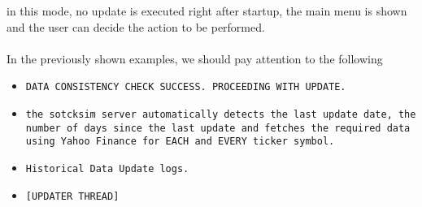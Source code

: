 in this mode, no update is executed right after startup, the main menu is shown
and the user can decide the action to be performed.\\
\\
In the previously shown examples, we should pay attention to the following
\begin{itemize}
    \item \texttt{DATA CONSISTENCY CHECK SUCCESS. PROCEEDING WITH UPDATE.}
    \item \texttt{the sotcksim server automatically detects the last update
    date, the number of days since the last update and fetches the required
    data using Yahoo Finance for EACH and EVERY ticker symbol.}
    \item \texttt{Historical Data Update logs.}
    \item \texttt{[UPDATER THREAD]}
\end{itemize}
